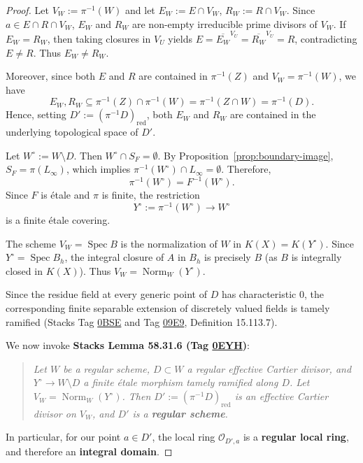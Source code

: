 \documentclass[11pt,reqno]{amsart}
\theoremstyle{plain}
\theoremstyle{definition}
\numberwithin{equation}{section}
\DeclareMathOperator{\Spec}{Spec}
\newcommand{\cO}{\mathcal{O}}
\begin{document}
\begin{proof}
Let $V_W := \pi^{-1}(W)$ and let $E_W := E \cap V_W$, $R_W := R \cap V_W$. Since $a \in E \cap R \cap V_W$, $E_W$ and $R_W$ are non-empty irreducible prime divisors of $V_W$. If $E_W = R_W$, then taking closures in $V_U$ yields $E = \overline{E_W}^{V_U} = \overline{R_W}^{V_U} = R$, contradicting $E \neq R$. Thus $E_W \neq R_W$.

Moreover, since both $E$ and $R$ are contained in $\pi^{-1}(Z)$ and $V_W = \pi^{-1}(W)$, we have
\[
E_W, R_W \subseteq \pi^{-1}(Z) \cap \pi^{-1}(W) = \pi^{-1}(Z \cap W) = \pi^{-1}(D).
\]
Hence, setting $D' := (\pi^{-1}D)_{\mathrm{red}}$, both $E_W$ and $R_W$ are contained in the underlying topological space of $D'$.

Let $W^\circ := W \setminus D$. Then $W^\circ \cap S_F = \emptyset$.
By Proposition~\ref{prop:boundary-image}, $S_F = \pi(L_\infty)$, which implies $\pi^{-1}(W^\circ) \cap L_\infty = \emptyset$. Therefore,
\[
\pi^{-1}(W^\circ) = F^{-1}(W^\circ).
\]
Since $F$ is \'{e}tale and $\pi$ is finite, the restriction
\[
Y^\circ := \pi^{-1}(W^\circ) \longrightarrow W^\circ
\]
is a finite \'{e}tale covering.

The scheme $V_W = \Spec B$ is the normalization of $W$ in $K(X) = K(Y^\circ)$. Since $Y^\circ = \Spec B_h$, the integral closure of $A$ in $B_h$ is precisely $B$ (as $B$ is integrally closed in $K(X)$). Thus $V_W = \operatorname{Norm}_W(Y^\circ)$.

Since the residue field at every generic point of $D$ has characteristic 0, the corresponding finite separable extension of discretely valued fields is tamely ramified (Stacks Tag \href{https://stacks.math.columbia.edu/tag/0BSE}{0BSE} and Tag \href{https://stacks.math.columbia.edu/tag/09E9}{09E9}, Definition 15.113.7).

We now invoke \textbf{Stacks Lemma 58.31.6 (Tag \href{https://stacks.math.columbia.edu/tag/0EYH}{0EYH})}:
\begin{quote}
\emph{Let $W$ be a regular scheme, $D \subset W$ a regular effective Cartier divisor, and $Y^\circ \to W \setminus D$ a finite \'{e}tale morphism tamely ramified along $D$. Let $V_W = \operatorname{Norm}_W(Y^\circ)$. Then $D' := (\pi^{-1}D)_{\mathrm{red}}$ is an effective Cartier divisor on $V_W$, and $D'$ is a \textbf{regular scheme}.}
\end{quote}

In particular, for our point $a \in D'$, the local ring $\cO_{D', a}$ is a \textbf{regular local ring}, and therefore an \textbf{integral domain}.


\end{proof}
\end{document}
